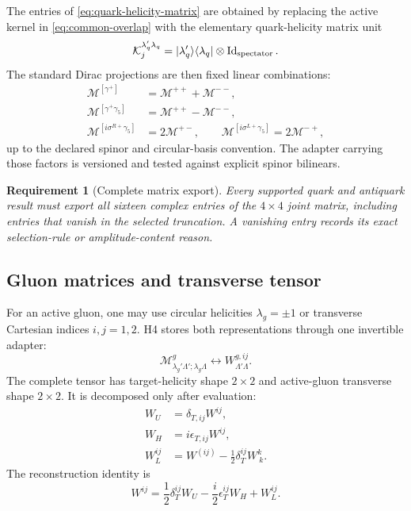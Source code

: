 \documentclass[11pt]{article}
\newtheorem{requirement}[definition]{Requirement}
\newcommand{\Id}{\operatorname{Id}}
\newcommand{\cM}{\mathcal M}
\newcommand{\cK}{\mathcal K}
\begin{document}
The entries of \cref{eq:quark-helicity-matrix} are obtained by replacing the
active kernel in \cref{eq:common-overlap} with the elementary quark-helicity
matrix unit
\begin{equation}
 \cK^{\lambda_q'\lambda_q}_{j}
 =|\lambda_q'\rangle\langle\lambda_q|
 \otimes\Id_{\rm spectator}.
\end{equation}
The standard Dirac projections are then fixed linear combinations:
\begin{align}
 \cM^{[\gamma^+]}&=\cM^{++}+\cM^{--},\nonumber\\
 \cM^{[\gamma^+\gamma_5]}&=\cM^{++}-\cM^{--},\nonumber\\
 \cM^{[i\sigma^{R+}\gamma_5]}&=2\cM^{+-},\qquad
 \cM^{[i\sigma^{L+}\gamma_5]}=2\cM^{-+},
 \label{eq:quark-helicity-dirac-map}
\end{align}
up to the declared spinor and circular-basis convention.  The adapter carrying
those factors is versioned and tested against explicit spinor bilinears.

\begin{requirement}[Complete matrix export]
\label{req:complete-quark-matrix}
Every supported quark and antiquark result must export all sixteen complex
entries of the \(4\times4\) joint matrix, including entries that vanish in the
selected truncation.  A vanishing entry records its exact selection-rule or
amplitude-content reason.
\end{requirement}

\subsection{Gluon matrices and transverse tensor}

For an active gluon, one may use circular helicities
\(\lambda_g=\pm1\) or transverse Cartesian indices \(i,j=1,2\).  H4 stores both
representations through one invertible adapter:
\begin{equation}
 \cM^{g}_{\lambda_g'\Lambda';\lambda_g\Lambda}
 \longleftrightarrow
 W^{g,ij}_{\Lambda'\Lambda}.
 \label{eq:gluon-circular-cartesian}
\end{equation}
The complete tensor has target-helicity shape \(2\times2\) and active-gluon
transverse shape \(2\times2\).  It is decomposed only after evaluation:
\begin{align}
 W_U&=\delta_{T,ij}W^{ij},\label{eq:gluon-trace}\\
 W_H&=i\epsilon_{T,ij}W^{ij},\label{eq:gluon-antisym}\\
 W_L^{ij}&=W^{(ij)}-\frac12\delta_T^{ij}W^k_{\ k}.
 \label{eq:gluon-st}
\end{align}
The reconstruction identity is
\begin{equation}
 W^{ij}
 =\frac12\delta_T^{ij}W_U
 -\frac{i}{2}\epsilon_T^{ij}W_H
 +W_L^{ij}.
 \label{eq:gluon-polarization-reconstruction}
\end{equation}
\end{document}
